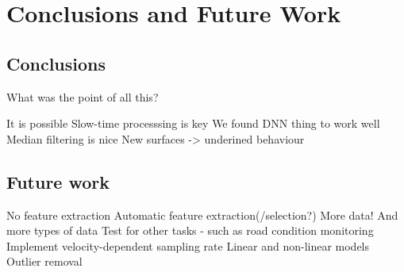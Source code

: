 \chapter{Conclusions and Future Work}

\section{Conclusions}

	What was the point of all this?
	
	It is possible
	Slow-time processsing is key
	We found DNN thing to work well
	Median filtering is nice
	New surfaces -> underined behaviour



\section{Future work}

	No feature extraction
	Automatic feature extraction(/selection?)
	More data! And more types of data
	Test for other tasks - such as road condition monitoring
	Implement velocity-dependent sampling rate
	Linear and non-linear models
	Outlier removal
